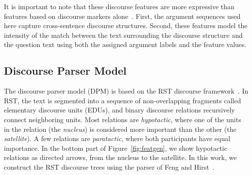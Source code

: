 %
%

It is important to note that these discourse features are more expressive than features based on discourse markers alone~\cite{Higashinaka:08,Verberne:10}. First, the argument sequences used here capture cross-sentence discourse structures.  Second, these features model the intensity of the match between the text surrounding the discourse structure and the question text using both the assigned argument labels and the  feature values.

\subsection{Discourse Parser Model}
\label{sec-naacl2015:features_parser}

The discourse parser model (DPM) is based on the RST discourse framework~\cite{mann88}. 
In RST, the text is segmented into a sequence of non-overlapping fragments called elementary discourse units (EDUs), and binary discourse relations recursively connect neighboring units. Most relations are {\em hypotactic}, where one of the units in the relation (the {\em nucleus}) is considered more important than the other (the {\em satellite}). A few relations are {\em paratactic}, where both participants have equal importance. In the bottom part of Figure~\ref{fig:featgen}, we show hypotactic relations as directed arrows, from the nucleus to the satellite. 
In this work, we construct the RST discourse trees using the parser of Feng and Hirst~\citeyear{feng12}. 

